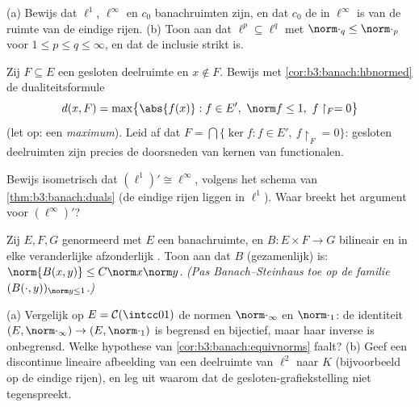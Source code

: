 \begin{exercise}[$\star\star$]\label{exo:b3:banach:3}
(a) Bewijs dat $\ell^1$, $\ell^\infty$ en $c_0$ banachruimten
zijn, en dat $c_0$ de  in $\ell^\infty$ is van de
ruimte van de eindige rijen.
(b) Toon aan dat $\ell^p \subseteq \ell^q$ met $\norm\cdot_q \leq
\norm\cdot_p$ voor $1 \leq p \leq q \leq \infty$, en dat de
inclusie strikt is.
\end{exercise}

\begin{exercise}[$\star\star$]\label{exo:b3:banach:4}
Zij $F \subseteq E$ een gesloten deelruimte en $x \notin F$.
Bewijs met \cref{cor:b3:banach:hbnormed} de dualiteitsformule
\[
d(x, F) = \max\bigl\{\abs{f(x)} : f \in E',\ \norm f \leq 1,\
f\restriction_F = 0\bigr\}
\]
(let op: een \emph{maximum}). Leid af dat $F = \bigcap\{\ker f : f
\in E',\ f\restriction_F = 0\}$: gesloten deelruimten zijn precies
de doorsneden van kernen van functionalen.
\end{exercise}

\begin{exercise}[$\star\star$]\label{exo:b3:banach:5}
Bewijs isometrisch dat $(\ell^1)' \cong \ell^\infty$, volgens het
schema van \cref{thm:b3:banach:duals} (de eindige rijen liggen
 in $\ell^1$). Waar breekt het argument voor
$(\ell^\infty)'$?
\end{exercise}

\begin{exercise}[$\star\star$]\label{exo:b3:banach:6}
Zij $E, F, G$ genormeerd met $E$ een banachruimte, en $B \colon E
\times F \to G$ bilineair en in elke veranderlijke afzonderlijk
. Toon aan dat $B$ (gezamenlijk)  is: $\norm{B(x,y)}
\leq C\norm x\norm y$. \emph{(Pas Banach--Steinhaus toe op de
familie $(B(\cdot, y))_{\norm y \leq 1}$.)}
\end{exercise}

\begin{exercise}[$\star\star$]\label{exo:b3:banach:7}
(a) Vergelijk op $E = \mathcal C(\intcc01)$ de normen
$\norm\cdot_\infty$ en $\norm\cdot_1$: de identiteit $(E,
\norm\cdot_\infty) \to (E, \norm\cdot_1)$ is begrensd en
bijectief, maar haar inverse is onbegrensd. Welke hypothese van
\cref{cor:b3:banach:equivnorms} faalt?
(b) Geef een discontinue lineaire afbeelding van een 
deelruimte van $\ell^2$ naar $K$ (bijvoorbeeld op de eindige
rijen), en leg uit waarom dat de gesloten-grafiekstelling niet
tegenspreekt.
\end{exercise}


